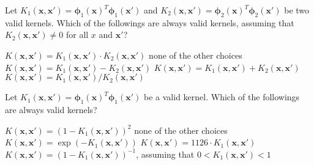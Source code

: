 \documentclass[a4paper,10pt]{exam}
\begin{document}
\begin{questions}
   \question Let $K_1(\mathbf{x}, \mathbf{x}') = {\boldsymbol\phi}_1(\mathbf{x}) ^T {\boldsymbol\phi}_1(\mathbf{x}')$ and $K_2(\mathbf{x}, \mathbf{x}') = {\boldsymbol\phi}_2(\mathbf{x}) ^T {\boldsymbol\phi}_2(\mathbf{x}')$ be two valid kernels. Which of the followings are always valid kernels, assuming that $K_2(\mathbf{x}, \mathbf{x}') \neq 0$ for all $x$ and $\mathbf{x}'$?
   \begin{checkboxes}
   	 \CorrectChoice $K(\mathbf{x}, \mathbf{x}') = K_1(\mathbf{x}, \mathbf{x}') \cdot K_2(\mathbf{x}, \mathbf{x}')$
   	 \choice none of the other choices
   	 \choice $K(\mathbf{x}, \mathbf{x}') = K_1(\mathbf{x}, \mathbf{x}') - K_2(\mathbf{x}, \mathbf{x}')$
   	 \CorrectChoice $K(\mathbf{x}, \mathbf{x}') = K_1(\mathbf{x}, \mathbf{x}') + K_2(\mathbf{x}, \mathbf{x}')$
   	 \choice $K(\mathbf{x}, \mathbf{x}') = K_1(\mathbf{x}, \mathbf{x}') / K_2(\mathbf{x}, \mathbf{x}')$\\
   \end{checkboxes}
   
   \question Let $K_1(\mathbf{x}, \mathbf{x}') = {\boldsymbol\phi}_1(\mathbf{x}) ^T {\boldsymbol\phi}_1(\mathbf{x}')$ be a valid kernel. Which of the followings are always valid kernels?
   \begin{checkboxes}
   	 \choice $K(\mathbf{x}, \mathbf{x}') = (1 - K_1(\mathbf{x}, \mathbf{x}'))^{2}$
   	 \choice none of the other choices
   	 \choice $K(\mathbf{x}, \mathbf{x}') = \exp(-K_1(\mathbf{x}, \mathbf{x}'))$
   	 \CorrectChoice $K(\mathbf{x}, \mathbf{x}') = 1126 \cdot K_1(\mathbf{x}, \mathbf{x}')$
   	 \CorrectChoice $K(\mathbf{x}, \mathbf{x}') = (1 - K_1(\mathbf{x}, \mathbf{x}'))^{-1}$, assuming that $0 < K_1(\mathbf{x}, \mathbf{x}') < 1$\\
   \end{checkboxes}
   

\end{questions}
\end{document}

